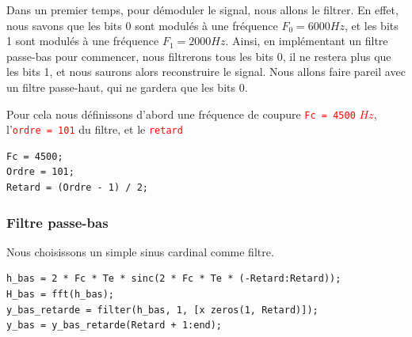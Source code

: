Dans un premier temps, pour démoduler le signal, nous allons le filtrer. En effet, nous savons que les bits 0 sont modulés à une fréquence $F_0 = 6000Hz$, et les bits 1 sont modulés à une fréquence $F_1 = 2000Hz$.
Ainsi, en implémentant un filtre passe-bas pour commencer, nous filtrerons tous les bits 0, il ne restera plus que les bits 1, et nous saurons alors reconstruire le signal. Nous allons faire pareil avec un filtre passe-haut, qui ne gardera que les bits 0.

Pour cela nous définissons d'abord une fréquence de coupure \textcolor{Red}{\lstinline{Fc = 4500} $Hz$}, l'\textcolor{Red}{\lstinline{ordre = 101}} du filtre, et le
\textcolor{Red}{\lstinline{retard}}
\begin{lstlisting}
Fc = 4500;
Ordre = 101;
Retard = (Ordre - 1) / 2;   
\end{lstlisting}
\subsubsection{Filtre passe-bas}
Nous choisissons un simple sinus cardinal comme filtre.

\begin{lstlisting}[caption=Filtre passe-bas]
h_bas = 2 * Fc * Te * sinc(2 * Fc * Te * (-Retard:Retard));
H_bas = fft(h_bas);
y_bas_retarde = filter(h_bas, 1, [x zeros(1, Retard)]);
y_bas = y_bas_retarde(Retard + 1:end);
\end{lstlisting}

